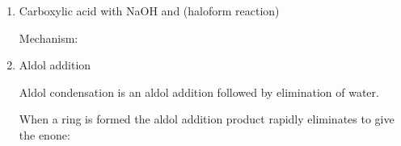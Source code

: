 \begin{enumerate}[label=\alph*)]
\begin{enumerate}[label=\roman*)]
      \item Carboxylic acid with NaOH and  (haloform reaction)


        Mechanism:


      \item Aldol addition


        Aldol condensation is an aldol addition followed by elimination of water.


        When a ring is formed the aldol addition product rapidly eliminates
        to give the enone:


		\end{enumerate}

\end{enumerate}





